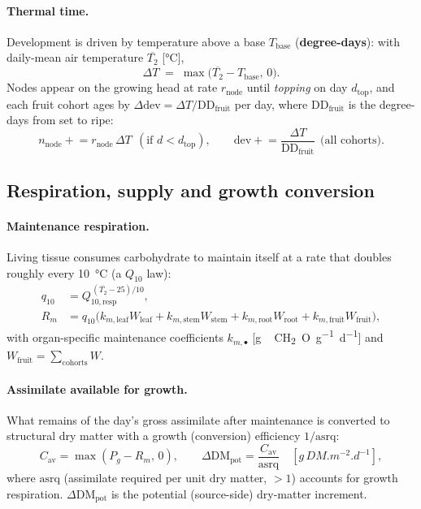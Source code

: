 \documentclass[11pt,a4paper]{article}
\newcommand{\Tair}{T_{2}}
\begin{document}
\paragraph{Thermal time.} Development is driven by temperature above a base $T_{\text{base}}$
(\textbf{degree-days}): with daily-mean air temperature $\overline{\Tair}$ [\si{\degreeCelsius}],
\begin{equation}
  \Delta T \;=\; \max\!\big(\overline{\Tair}-T_{\text{base}},\,0\big).
\end{equation}
Nodes appear on the growing head at rate $r_{\text{node}}$ until \emph{topping} on day
$d_{\text{top}}$, and each fruit cohort ages by $\Delta\mathrm{dev}=\Delta T/\mathrm{DD}_{\text{fruit}}$
per day, where $\mathrm{DD}_{\text{fruit}}$ is the degree-days from set to ripe:
\begin{equation}
  n_{\text{node}} \mathrel{+}= r_{\text{node}}\,\Delta T \ \ (\text{if } d<d_{\text{top}}),\qquad
  \mathrm{dev} \mathrel{+}= \frac{\Delta T}{\mathrm{DD}_{\text{fruit}}}\ \ \text{(all cohorts)}.
\end{equation}

\subsection{Respiration, supply and growth conversion}\label{sec:resp}
\paragraph{Maintenance respiration.} Living tissue consumes carbohydrate to maintain itself at a
rate that doubles roughly every \SI{10}{\degreeCelsius} (a $Q_{10}$ law):
\begin{align}
  q_{10} &= Q_{10,\text{resp}}^{\,(\overline{\Tair}-25)/10},\\
  R_m &= q_{10}\big(k_{m,\text{leaf}}W_{\text{leaf}} + k_{m,\text{stem}}W_{\text{stem}} + k_{m,\text{root}}W_{\text{root}} + k_{m,\text{fruit}}W_{\text{fruit}}\big),
\end{align}
with organ-specific maintenance coefficients $k_{m,\bullet}$ [\si{g\,CH_2O.g^{-1}.d^{-1}}] and
$W_{\text{fruit}}=\sum_{\text{cohorts}}W$. \paragraph{Assimilate available for growth.} What remains
of the day's gross assimilate after maintenance is converted to structural dry matter with a growth
(conversion) efficiency $1/\mathrm{asrq}$:
\begin{equation}
  C_{\text{av}} = \max(P_g - R_m,\,0), \qquad
  \Delta \mathrm{DM}_{\text{pot}} = \frac{C_{\text{av}}}{\mathrm{asrq}} \quad[\si{g\,DM.m^{-2}.d^{-1}}],
  \label{eq:supply}
\end{equation}
where $\mathrm{asrq}$ (assimilate required per unit dry matter, $>1$) accounts for growth
respiration. $\Delta\mathrm{DM}_{\text{pot}}$ is the potential (source-side) dry-matter increment.
\end{document}
